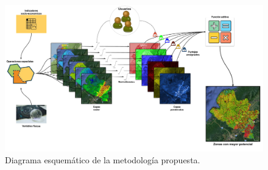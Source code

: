 
\begin{figure}
    \centering
    \includegraphics[width=1\textwidth]{figures/plan}
    \caption{Diagrama esquemático de la metodología propuesta.}
    \label{fig:plan}
\end{figure}
